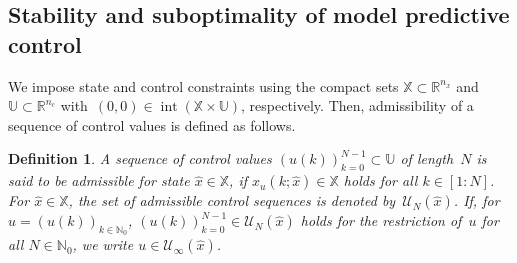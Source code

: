 \documentclass{article}
\numberwithin{equation}{section}
\newtheorem{definition}[theorem]{Definition}
\newcommand{\nx}{n_x}
\newcommand{\nc}{n_c}
\newcommand{\calU}{\mathcal U}
\newcommand{\bX}{\mathbb X}
\newcommand{\bU}{\mathbb U}
\begin{document}
	
	
	\subsection{Stability and suboptimality of model predictive control}\label{sec:mpc}
	
	We impose state and control constraints using the compact sets $\bX \subset \mathbb{R}^{\nx}$ and $\bU \subset \mathbb{R}^{\nc}$ with~$(0,0) \in \operatorname{int}(\bX \times \bU)$, respectively. %
	Then, admissibility of a sequence of control values is defined as follows.
	\begin{definition}\label{def:admissibility}
		A sequence of control values $(u(k))_{k=0}^{N-1} \subset \bU$ of length~$N$ is said to be admissible for state $\hat{x} \in \bX$, if $x_u(k;\hat{x}) \in \bX$ holds for all $k \in [1:N]$. 
		For $\hat{x} \in \bX$, the set of admissible control sequences is denoted by~$\calU_N(\hat{x})$. If, for $u = (u(k))_{k \in \mathbb{N}_0}$, $(u(k))_{k=0}^{N-1} \in \calU_N(\hat{x})$ holds for the restriction of~$u$ for all $N \in \mathbb{N}_0$, we write $u \in \calU_\infty(\hat{x})$.
	\end{definition}
	
\end{document}
